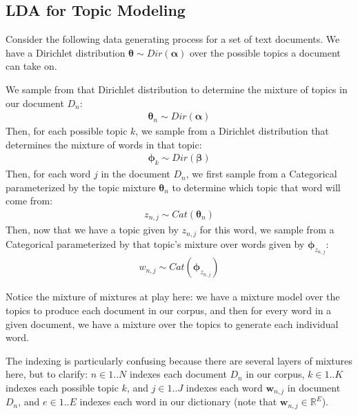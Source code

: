 \subsection{LDA for Topic Modeling}
Consider the following data generating process for a set of text documents. We have a Dirichlet distribution $\boldsymbol{\theta} \sim Dir(\boldsymbol{\alpha})$ over the possible topics a document can take on.


We sample from that Dirichlet distribution to determine the mixture of topics in our document $D_n$:
\begin{align*}
    \boldsymbol{\theta}_n \sim Dir(\boldsymbol{\alpha})
\end{align*}
Then, for each possible topic $k$, we sample from a Dirichlet distribution that determines the mixture of words in that topic:
\begin{align*}
    \boldsymbol{\phi}_k \sim Dir(\boldsymbol{\beta})
\end{align*}
Then, for each word $j$ in the document $D_n$, we first sample from a Categorical parameterized by the topic mixture $\boldsymbol{\theta}_n$ to determine which topic that word will come from:
\begin{align*}
    z_{n, j} \sim Cat(\boldsymbol{\theta}_n)
\end{align*}
Then, now that we have a topic given by $z_{n, j}$ for this word, we sample from a Categorical parameterized by that topic's mixture over words given by $\boldsymbol{\phi}_{z_{n, j}}$:
\begin{align*}
    w_{n, j} \sim Cat(\boldsymbol{\phi}_{z_{n, j}})
\end{align*}

Notice the mixture of mixtures at play here: we have a mixture model over the topics to produce each document in our corpus, and then for every word in a given document, we have a mixture over the topics to generate each individual word.

The indexing is particularly confusing because there are several layers of mixtures here, but to clarify: $n \in 1..N$ indexes each document $D_n$ in our corpus, $k \in 1..K$ indexes each possible topic $k$, and $j \in 1..J$ indexes each word $\textbf{w}_{n,j}$ in document $D_n$, and $e \in 1..E$ indexes each word in our dictionary (note that $\textbf{w}_{n,j} \in \mathbb{R}^{E}$).

